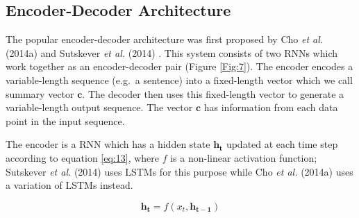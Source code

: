  

\subsection{Encoder-Decoder Architecture} 
\label{bg:sub9}

The popular encoder-decoder architecture was first proposed by Cho \textit{et al.} (2014a) \cite{cho2014learning} and Sutskever \textit{et al.} (2014) \cite{sutskever2014sequence}. This system consists of two \ac{RNN}s which work together as an encoder-decoder pair (Figure \ref{Fig:7}). The encoder encodes a variable-length sequence (e.g.\ a sentence) into a fixed-length vector which we call summary vector $ \mathbf{c} $. The decoder then uses this fixed-length vector to generate a variable-length output sequence. The vector $ \mathbf{c} $ has information from each data point in the input sequence.


The encoder is a \ac{RNN} which has a hidden state $\mathbf{h_t}$ updated at each time step according to equation \ref{eq:13}, where $f$ is a non-linear activation function;  Sutskever \textit{et al.} (2014) \cite{sutskever2014sequence} uses \ac{LSTM}s for this purpose while Cho \textit{et al.} (2014a) \cite{cho2014learning} uses a variation of \ac{LSTM}s instead.

\begin{equation}
\label{eq:13}
\mathbf{h_t} = f( x_t, \mathbf{h_{t-1}})
\end{equation}


